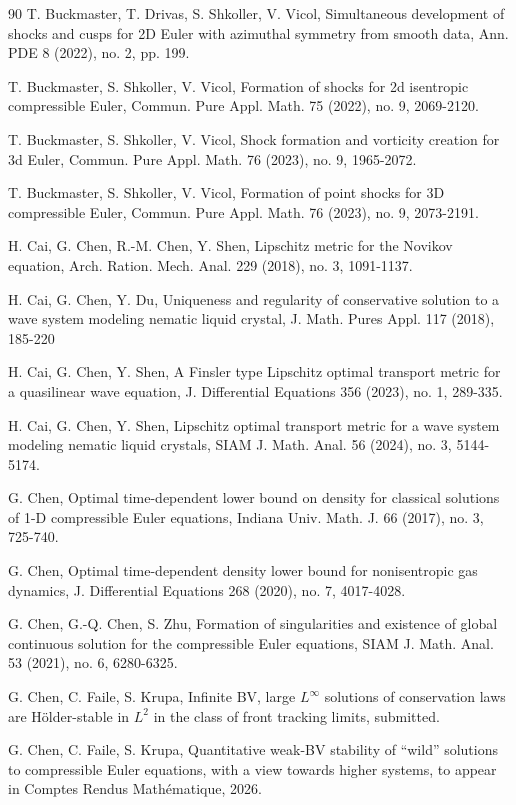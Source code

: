\documentclass[11pt,reqno]{article}
\numberwithin{equation}{section}
\begin{document}
\begin{thebibliography}{90}
 T. Buckmaster, T. Drivas, S. Shkoller, V. Vicol, Simultaneous development of shocks and cusps for 2D Euler with azimuthal symmetry from smooth data, Ann. PDE 8 (2022), no. 2, pp. 199.

 T. Buckmaster, S. Shkoller, V. Vicol, Formation of shocks for 2d
isentropic compressible Euler, Commun. Pure Appl. Math. 75 (2022), no. 9, 2069-2120.

 T. Buckmaster, S. Shkoller, V. Vicol, Shock formation and vorticity creation for 3d Euler, Commun. Pure Appl. Math. 76 (2023), no. 9, 1965-2072.

 T. Buckmaster, S. Shkoller, V. Vicol, Formation of point shocks for 3D compressible Euler, Commun. Pure Appl. Math. 76 (2023), no. 9, 2073-2191.

 H. Cai, G. Chen, R.-M. Chen, Y. Shen, Lipschitz metric for the Novikov equation, Arch. Ration. Mech. Anal. 229 (2018), no. 3, 1091-1137.

 H. Cai, G. Chen, Y. Du, Uniqueness and regularity of conservative solution to a wave system modeling nematic liquid crystal, J. Math. Pures Appl. 117 (2018), 185-220

 H. Cai, G. Chen, Y. Shen, A Finsler type Lipschitz optimal transport metric for a quasilinear wave equation, J. Differential Equations 356 (2023), no. 1, 289-335.

 H. Cai, G. Chen, Y. Shen, Lipschitz optimal transport metric for a wave system modeling nematic liquid crystals, SIAM J. Math. Anal. 56 (2024), no. 3, 5144-5174.

 G. Chen, Optimal time-dependent lower bound on density for classical solutions of 1-D compressible Euler equations, Indiana Univ. Math. J. 66 (2017), no. 3, 725-740.

 G. Chen, Optimal time-dependent density lower bound for nonisentropic gas dynamics, J. Differential Equations 268 (2020), no. 7, 4017-4028.

 G. Chen, G.-Q. Chen, S. Zhu, Formation of singularities and existence of global continuous solution for the compressible Euler equations, SIAM J. Math. Anal. 53 (2021), no. 6, 6280-6325.

G. Chen, C. Faile, S. Krupa, Infinite BV, large $L^\infty$ solutions of conservation laws are H\"older-stable in $L^2$ in the class of front tracking limits, submitted.

 G. Chen, C. Faile, S. Krupa, Quantitative weak-BV stability of ``wild'' solutions to compressible Euler equations, with a view towards higher systems, to appear in  Comptes Rendus Math\'{e}matique, 2026.


\end{thebibliography}
\end{document}
